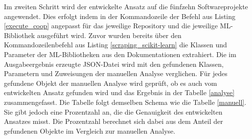 \documentclass[german,bachelor]{swsLeipzig}
\begin{document}
\noindent Im zweiten Schritt wird der entwickelte Ansatz auf die fünfzehn Softwareprojekte angewendet.
Dies erfolgt indem in der Kommandozeile der Befehl aus Listing \ref{execute_coop} angepasst für das jeweilige Repository und die
jeweilige ML-Bibliothek ausgeführt wird.
Zuvor wurden bereits über den Kommandozeilenbefehl aus Listing \ref{scraping_scikit-learn} die Klassen und Parameter
der ML-Bibliotheken aus den Dokumentationen extrahiert.
Die im Ausgabeergebnis erzeugte JSON-Datei wird mit den gefundenen Klassen, Parametern und Zuweisungen der manuellen
Analyse verglichen.
Für jedes gefundene Objekt der manuellen Analyse wird geprüft, ob es auch vom entwickelten Ansatz gefunden wird und
das Ergebnis in der Tabelle \ref{analyse} zusammengefasst.
Die Tabelle folgt demselben Schema wie die Tabelle \ref{manuell}.
Sie gibt jedoch eine Prozentzahl an, die die Genauigkeit des entwickelten Ansatzes misst.
Die Prozentzahl berechnet sich dabei aus dem Anteil der gefundenen Objekte im Vergleich zur manuellen Analyse.
\end{document}
